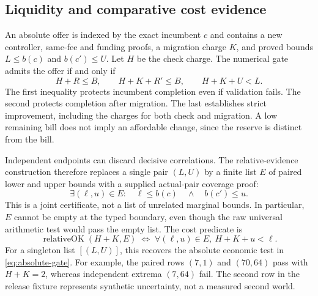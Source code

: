 \documentclass[10pt,letterpaper]{article}
\begin{document}
\subsection{Liquidity and comparative cost evidence}
An absolute offer is indexed by the exact incumbent $c$ and contains a new controller, same-fee and funding proofs, a migration charge $K$, and proved bounds $L\le b(c)$ and $b(c')\le U$. Let $H$ be the check charge. The numerical gate admits the offer if and only if
\begin{equation}\label{eq:absolute-gate}
 H+R\le B,\qquad H+K+R'\le B,\qquad H+K+U<L.
\end{equation}
The first inequality protects incumbent completion even if validation fails. The second protects completion after migration. The last establishes strict improvement, including the charges for both check and migration. A low remaining bill does not imply an affordable change, since the reserve is distinct from the bill.

Independent endpoints can discard decisive correlations. The relative-evidence construction therefore replaces a single pair $(L,U)$ by a finite list $E$ of paired lower and upper bounds with a supplied actual-pair coverage proof:
\begin{equation}\label{eq:actual-coverage}
 \exists (\ell,u)\in E:\quad \ell\le b(c)\quad\land\quad b(c')\le u.
\end{equation}
This is a joint certificate, not a list of unrelated marginal bounds. In particular, $E$ cannot be empty at the typed boundary, even though the raw universal arithmetic test would pass the empty list. The cost predicate is
\begin{equation}\label{eq:relative-gate}
 \operatorname{relativeOK}(H+K,E)\;\Longleftrightarrow\;
 \forall(\ell,u)\in E,\ H+K+u<\ell.
\end{equation}
For a singleton list $[(L,U)]$, this recovers the absolute economic test in \eqref{eq:absolute-gate}. For example, the paired rows $(7,1)$ and $(70,64)$ pass with $H+K=2$, whereas independent extrema $(7,64)$ fail. The second row in the release fixture represents synthetic uncertainty, not a measured second world.
\end{document}
